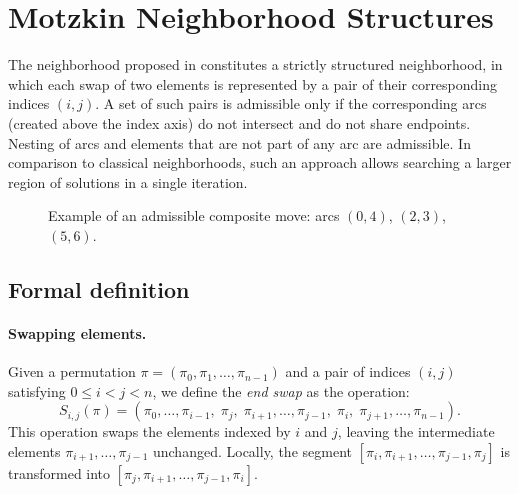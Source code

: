 \documentclass[runningheads]{llncs}
\begin{document}
\section{Motzkin Neighborhood Structures}
The neighborhood proposed in \cite{Motzkin_PWR} constitutes a strictly structured neighborhood, in which each swap of two elements is represented by a pair of their corresponding indices $(i,j)$. A set of such pairs is admissible only if the corresponding arcs (created above the index axis) do not intersect and do not share endpoints. Nesting of arcs and elements that are not part of any arc are admissible. In comparison to classical neighborhoods, such an approach allows searching a larger region of solutions in a single iteration.

\begin{figure}[ht]
  \centering
  \caption{Example of an admissible composite move: arcs $(0,4)$, $(2,3)$, $(5,6)$.}
    \label{fig:motzkin_arcs}
\end{figure}

\subsection{Formal definition}
\paragraph{Swapping elements.} Given a permutation $\pi = (\pi_0,\pi_1,\ldots,\pi_{n-1})$ and a pair of indices $(i,j)$ satisfying $0 \le i < j < n$, we define the \emph{end swap} as the operation:
\begin{equation}\label{eq:S_ij}
S_{i,j}(\pi) = (\pi_0,\ldots,\pi_{i-1},\; \pi_j,\; \pi_{i+1},\ldots,\pi_{j-1},\; \pi_i,\; \pi_{j+1},\ldots,\pi_{n-1}).
\end{equation}
This operation swaps the elements indexed by $i$ and $j$, leaving the intermediate elements $\pi_{i+1},\ldots,\pi_{j-1}$ unchanged. Locally, the segment $[\pi_i,\pi_{i+1},\ldots,\pi_{j-1},\pi_j]$ is transformed into $[\pi_j,\pi_{i+1},\ldots,\pi_{j-1},\pi_i]$.
\end{document}
